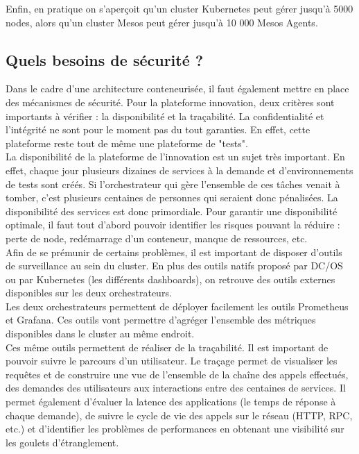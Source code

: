 \documentclass[11pt,fleqn]{book} %
\begin{document}
Enfin, en pratique on s'aperçoit qu'un cluster Kubernetes peut gérer jusqu'à 5000 nodes, alors qu'un cluster Mesos peut gérer jusqu'à 10 000 Mesos Agents.

\subsection{Quels besoins de sécurité ?}
Dans le cadre d'une architecture conteneurisée, il faut également mettre en place des mécanismes de sécurité. Pour la plateforme innovation, deux critères sont importants à vérifier : la disponibilité et la traçabilité. La confidentialité et l'intégrité ne sont pour le moment pas du tout garanties. En effet, cette plateforme reste tout de même une plateforme de "tests".\\

La disponibilité de la plateforme de l’innovation est un sujet très important. En effet, chaque jour plusieurs dizaines de services à la demande et d’environnements de tests sont créés. Si l’orchestrateur qui gère l’ensemble de ces tâches venait à tomber, c’est plusieurs centaines de personnes qui seraient donc pénalisées. La disponibilité des services est donc primordiale. Pour garantir une disponibilité optimale, il faut tout d’abord pouvoir identifier les risques pouvant la réduire : perte de node, redémarrage d’un conteneur, manque de ressources, etc. \\

Afin de se prémunir de certains problèmes, il est important de disposer d’outils de surveillance au sein du cluster. En plus des outils natifs proposé par DC/OS ou par Kubernetes (les différents dashboards), on retrouve des outils externes disponibles sur les deux orchestrateurs.\\

Les deux orchestrateurs permettent de déployer facilement les outils Prometheus et Grafana. Ces outils vont permettre d'agréger l'ensemble des métriques disponibles dans le cluster au même endroit. \\

Ces même outils permettent de réaliser de la traçabilité. Il est important de pouvoir suivre le parcours d'un utilisateur. Le traçage permet de visualiser les requêtes et de construire une vue de l’ensemble de la chaîne des appels effectués, des demandes des utilisateurs aux interactions entre des centaines de services. Il permet également d’évaluer la latence des applications (le temps de réponse à chaque demande), de suivre le cycle de vie des appels sur le réseau (HTTP, RPC, etc.) et d’identifier les problèmes de performances en obtenant une visibilité sur les goulets d’étranglement.\\
\end{document}
